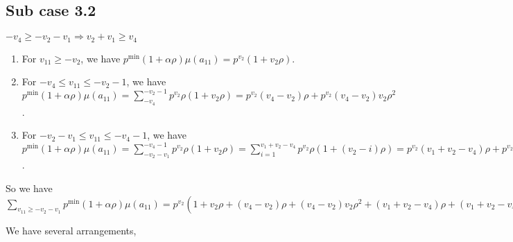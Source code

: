 \documentclass{article}
\begin{document}
\subsection{Sub case 3.2}
$-v_4\geq{-v_2-v_1}\Rightarrow{v_2+v_1\geq{v_4}}$
\begin{enumerate}
    \item 
For $v_{11}\geq{-v_2}$, we have $p^{\min}(1+\alpha\rho)\mu(a_{11})=p^{v_2}(1+v_2\rho)$.
\item 
For $-v_4\leq{v_{11}}\leq{-v_2-1}$, we have $p^{\min}(1+\alpha\rho)\mu(a_{11})=\sum_{-v_4}^{-v_2-1}p^{v_2}\rho(1+v_2\rho)=p^{v_2}(v_4-v_2)\rho+p^{v_2}(v_4-v_2)v_2\rho^2$.
\item 
For $-v_2-v_1\leq{v_{11}}\leq{-v_4-1}$, we have $p^{\min}(1+\alpha\rho)\mu(a_{11})=\sum_{-v_2-v_1}^{-v_4-1}p^{v_2}\rho(1+v_2\rho)=\sum_{i=1}^{v_1+v_2-v_
4}p^{v_2}\rho(1+(v_2-i)\rho)=p^{v_2}(v_1+v_2-v_4)\rho+p^{v_2}(v_1+v_2-v_4)v_2\rho^2-p^{v_2}\binom{v_1+v_2-v_4+1}{2}\rho^2$.
\end{enumerate}
So we have $\sum_{v_{11}\geq{-v_2-v_1}}p^{\min}(1+\alpha\rho)\mu(a_{11})=p^{v_2}(1+v_2\rho+(v_4-v_2)\rho+(v_4-v_2)v_2\rho^2+(v_1+v_2-v_4)\rho+(v_1+v_2-v_4)v_2\rho^2-\frac{(v_1+v_2-v_4+1)(v_1+v_2-v_4)}{2}\rho^2)=p^{v_2}(1+v_1\rho+v_2\rho-\frac{v_1^2}{2}\rho^2+v_4v_1\rho^2-\frac{v_2^2}{2}\rho^2+v_4v_2\rho^2-\frac{v_4^2}{2}\rho^2-\frac{v_1}{2}\rho^2-\frac{v_2}{2}\rho^2+\frac{v_4}{2}\rho^2)$

We have several arrangements,
\end{document}
